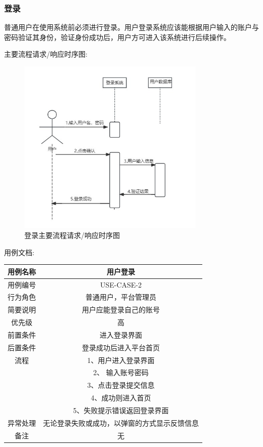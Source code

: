 \documentclass[12pt]{ctexart} %
\begin{document}
\subsubsection{登录}
普通用户在使用系统前必须进行登录。用户登录系统应该能根据用户输入的账户与密码验证其身份，验证身份成功后，用户方可进入该系统进行后续操作。

主要流程请求/响应时序图:

\begin{figure}[h]
  \centering
  \includegraphics[width=0.8\textwidth]{yongli2.jpg}
  \caption{登录主要流程请求/响应时序图}
\end{figure}

用例文档:

\begin{tabular}{|c|c|}
  \hline
  用例名称& 用户登录\\
  \hline
  用例编号 & USE-CASE-2\\
  \hline
  行为角色 & 普通用户，平台管理员\\
  \hline
  简要说明 & 用户应能登录自己的账号\\
  \hline
  优先级 & 高\\
  \hline
  前置条件 & 进入登录界面\\
  \hline
  后置条件 & 登录成功后进入平台首页\\
  \hline
  流程 & 1、用户进入登录界面\\
      & 2、 输入账号密码\\
      & 3、点击登录提交信息\\
      & 4、成功则进入首页\\
      & 5、失败提示错误返回登录界面\\
  \hline
  异常处理 & 无论登录失败或成功，以弹窗的方式显示反馈信息\\
  \hline
  备注 & 无\\
  \hline
\end{tabular}
\end{document}
